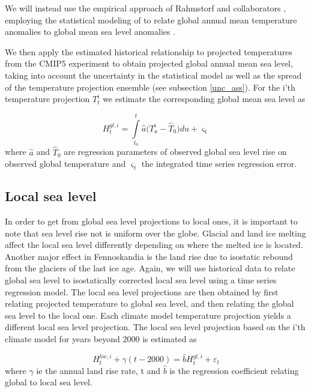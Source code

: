 \documentclass[draft,linenumbers]{agujournal}
\begin{document}
We will instead use the empirical approach of Rahmstorf and collaborators \citep{Rahmstorf07,Rahmstorf11}, employing the statistical modeling of \citet{Bolin2014a} to relate global annual mean temperature anomalies \citep{giss} to global mean sea level anomalies \citep{csiro}. 


We then apply the estimated historical relationship to projected temperatures from the CMIP5 experiment \citep{cmip5} to obtain projected global annual mean sea level, taking into account the uncertainty in the statistical model as well as the spread of the temperature projection ensemble (see subsection \ref{unc_ass}). 
For the i'th temperature projection $T_t^i$ we estimate the corresponding global mean sea level as

\[H_t^{gl,i} = \int\limits_{{t_0}}^t {{\hat a} (T_u^i - {{\hat T}_0}} )du + {\varsigma _t}\]
where ${\hat a}$ and ${\hat T}_0$ are regression parameters of observed global sea level  rise on observed global temperature and $\varsigma_t$ the integrated time series regression error.



\subsection{Local sea level}
In order to get from global sea level projections to local ones, it is important to note that sea level rise not is uniform over the globe. Glacial and land ice melting affect the local sea level differently depending on where the melted ice is located.
Another major effect in Fennoskandia is the land rise due to isostatic rebound from the glaciers of the last ice age. 
Again, we will use historical data to relate global sea level to isostatically corrected local sea level using a time series regression model. 
The local sea level projections are then obtained by first relating projected temperature to global sea level, and then relating the global sea level to the local one. Each climate model temperature projection yields a different local sea level projection. The local sea level projection based on the i'th climate model for years beyond 2000 is estimated as

\[H_t^{loc,i} + \gamma (t -2000 ) = {\hat b} H_t^{gl,i}  + {\varepsilon _t}\]
where $\gamma$ ie the annual land rise rate, t and $ {\hat b} $ is the regression coefficient relating global to local sea level.
\end{document}
